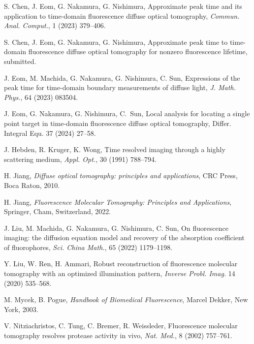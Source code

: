 \documentclass[10pt]{article}
\numberwithin{equation}{section}
\numberwithin{figure}{section}
\begin{document}
\begin{thebibliography}{99}
\setlength{\itemsep}{0mm}

 S. Chen, J. Eom, G. Nakamura, G. Nishimura, Approximate peak time and its application to time-domain fluorescence diffuse optical tomography, {\it Commun. Anal. Comput.}, 1 (2023) 379--406.

 S. Chen, J. Eom, G. Nakamura, G. Nishimura, Approximate peak time to time-domain fluorescence diffuse optical tomography for nonzero fluorescence lifetime, 
submitted.

 J. Eom, M. Machida, G. Nakamura, G. Nishimura, C. Sun, Expressions of the peak time for time-domain boundary measurements of diffuse light, {\it J. Math. Phys.}, 64 (2023) 083504. %

 J. Eom, G. Nakamura, G. Nishimura, C.~Sun, Local analysis for locating a single point target in time-domain fluorescence diffuse optical tomography, Differ. Integral Equ. 37 (2024) 27--58. %

 J. Hebden, R. Kruger, K. Wong, Time resolved imaging through a highly scattering medium, {\it Appl. Opt.}, 30 (1991) 788--794. %

 H. Jiang, {\it Diffuse optical tomography: principles and applications}, CRC Press, Boca Raton, 2010.

 H. Jiang, {\it Fluorescence Molecular Tomography: Principles and Applications}, Springer, Cham, Switzerland, 2022.

 J. Liu, M. Machida, G. Nakamura, G. Nishimura, C. Sun, On fluorescence imaging: the diffusion equation model and recovery of the absorption coefficient of fluorophores,
{\it Sci. China Math.}, 65 (2022) 1179--1198. %

 Y. Liu, W. Ren, H. Ammari, Robust reconstruction of fluorescence molecular tomography with an optimized illumination pattern, {\it Inverse Probl. Imag.} 14 (2020) 535--568. %

 M. Mycek, B. Pogue, {\it Handbook of Biomedical Fluorescence}, Marcel Dekker, New York, 2003.

 V. Nitziachristos, C. Tung, C. Bremer, R. Weissleder, Fluorescence molecular tomography resolves protease activity in vivo, {\it Nat. Med.}, 8 (2002) 757--761. %

\end{thebibliography}
\end{document}
